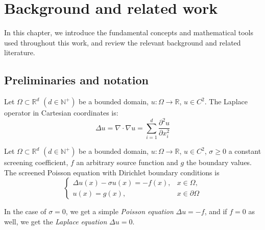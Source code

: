 \documentclass[
]{elteiktdk}[2024/04/26]
\begin{document}
	
	\chapter{Background and related work}
	\label{ch:background}
	
	In this chapter, we introduce the fundamental concepts and mathematical tools used throughout this work, and review the relevant background and related literature.
	
	\section{Preliminaries and notation}
	\label{sec:notation}
	
	\begin{definition}
		Let $\Omega \subset \mathbb{R}^d$ $(d \in \mathbb{N}^+)$ be a bounded domain, $u: \Omega \rightarrow \mathbb{R}$, $u \in C^2$. The Laplace operator in Cartesian coordinates is:
		\begin{equation}
			\Delta u = \nabla \cdot \nabla u = \sum^d_{i=1} \frac{\partial^2 u}{\partial x_i^2}
		\end{equation}
		
	\end{definition}
	
	\begin{definition}
		\label{screenedPoi}
		Let $\Omega \subset \mathbb{R}^d$ $(d \in \mathbb{N}^+)$ be a bounded domain, $u: \Omega \rightarrow \mathbb{R}$, $u \in C^2$, $\sigma \geq 0$ a constant screening coefficient, $f$ an arbitrary source function and $g$ the boundary values. The screened Poisson equation with Dirichlet boundary conditions is
		\begin{equation}
			\begin{cases}
				\Delta u(x) - \sigma u(x) = -f(x), & x \in \Omega, \\
				u(x) = g(x), & x \in \partial \Omega 
			\end{cases}
		\end{equation}   
	\end{definition}
	
	\begin{remark}
		In the case of $\sigma = 0$, we get a simple \textit{Poisson equation} $\Delta u = -f$, and if $f = 0$ as well, we get the \textit{Laplace equation} $\Delta u = 0$.
	\end{remark}
\end{document}
